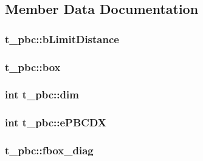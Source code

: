 \subsection{\-Member \-Data \-Documentation}
\hypertarget{structt__pbc_af1d0b57f71d11510cd403b2a32644def}{
\subsubsection[{b\-Limit\-Distance}]{ {\bf t\-\_\-pbc\-::b\-Limit\-Distance}}}\label{structt__pbc_af1d0b57f71d11510cd403b2a32644def}
\hypertarget{structt__pbc_aca34499dbcda948eeed8768db91d74a2}{
\subsubsection[{box}]{ {\bf t\-\_\-pbc\-::box}}}\label{structt__pbc_aca34499dbcda948eeed8768db91d74a2}
\hypertarget{structt__pbc_ad54855fa0733f3c75444af6dc1528636}{
\subsubsection[{dim}]{\setlength{\rightskip}{0pt plus 5cm}int {\bf t\-\_\-pbc\-::dim}}}\label{structt__pbc_ad54855fa0733f3c75444af6dc1528636}
\hypertarget{structt__pbc_a67ca9e136837b5a09f45b2764c42191b}{
\subsubsection[{e\-P\-B\-C\-D\-X}]{\setlength{\rightskip}{0pt plus 5cm}int {\bf t\-\_\-pbc\-::e\-P\-B\-C\-D\-X}}}\label{structt__pbc_a67ca9e136837b5a09f45b2764c42191b}
\hypertarget{structt__pbc_a80f61f863ae0f86d1096f317afbf232f}{
\subsubsection[{fbox\-\_\-diag}]{ {\bf t\-\_\-pbc\-::fbox\-\_\-diag}}}\label{structt__pbc_a80f61f863ae0f86d1096f317afbf232f}
